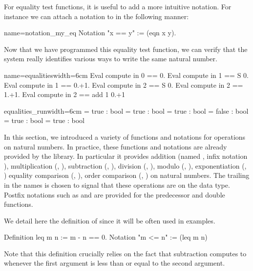 For equality test functions, it is useful to add a more intuitive
notation.  For instance we can attach a notation to  in
the following manner:

\begin{coq}{name=notation_my_eq}{}
Notation "x == y" := (eqn x y).
\end{coq}
Now
that we have programmed this equality test function, we can verify
that the \Coq{} system really identifies various ways to write the same
natural number.

\begin{coq}{name=equalities}{width=6cm}
Eval compute in 0 == 0.
Eval compute in 1 == S 0.
Eval compute in 1 == 0.+1.
Eval compute in 2 == S 0.
Eval compute in 2 == 1.+1.
Eval compute in 2 == add 1 0.+1
\end{coq}
\begin{coqout}{equalities_run}{width=6cm}
= true : bool
= true : bool
= true : bool
= false : bool
= true : bool
= true : bool
\end{coqout}



In this section, we introduced a variety of functions and notations
for operations on natural numbers.  In practice, these functions and
notations are already provided by the \mcbMC{} library.  In particular
it provides addition (named , infix notation \C{+}),
multiplication
(, \C{*}), subtraction (, \C{-}), division (,
\C{\%/}),  modulo (, \C{\%\%}), exponentiation (, \C{\^})
equality comparison (, \C{==}), order
comparison (, \C{<=}) on natural numbers.  The trailing  in
the names is chosen to signal that these operations are on the  data
type.  Postfix notations such as  and  are provided for
the predecessor and double functions.

We detail here the definition of  since it will be often used
in examples.
\begin{coq}{}{}
Definition leq m n := m - n == 0.
Notation "m <= n" := (leq m n)
\end{coq}
Note that this definition crucially relies on the fact that
subtraction computes to  whenever the first argument is less than
or equal to the second argument.

